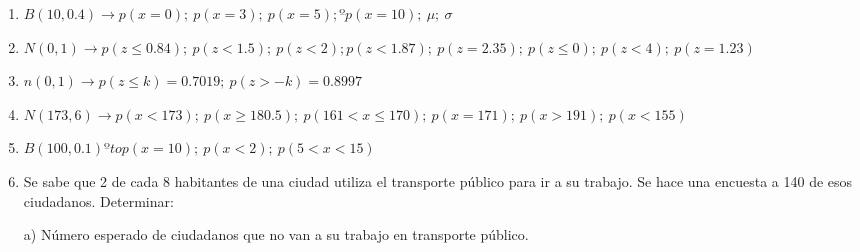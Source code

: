 	\begin{adjustwidth}{20pt}{10pt}
		\begin{enumerate}[PB. 1. ]
		
		
		\item 	$B(10,0.4) \to p(x=0);\ p(x=3);\ p(x=5);	º p(x=10);\ \mu;\ \sigma$ 
		
		\hspace{-1cm}\vspace{1cm}
		
		
		\item 	$N(0,1) \to p(z\le 0.84);\ p(z<1.5);\ p(z<2); p(z<1.87);\ p(z=2.35); \ p(z\le 0);\ p(z<4);\ p(z=1.23)$
		
		\hspace{-1cm}\vspace{1cm}
		
		
		
		\item 	$n(0,1)  \to p(z\le k)=0.7019;\ p(z>-k)=0.8997$
		
		\hspace{-1cm}\vspace{1cm}
		
		
		\item 	$N(173,6) \to p(x<173); \ p(x\ge 180.5);\ p(161<x\le170);\ p(x=171);\ p(x>191); \ p(x<155)$
		
		\hspace{-1cm}\vspace{1cm}
		
		
		
		\item 	$B(100,0.1) ºto p(x=10);\ p(x<2);\ p(5<x<15)$
		
		\hspace{-1cm}\vspace{1cm}
		
		\item 	Se sabe que 2 de cada 8 habitantes de una ciudad utiliza el transporte público para ir a su trabajo. Se hace una encuesta a 140 de esos ciudadanos. Determinar:
		
a) Número esperado de ciudadanos que no van a su trabajo en transporte público.


\end{enumerate}
\end{adjustwidth}
